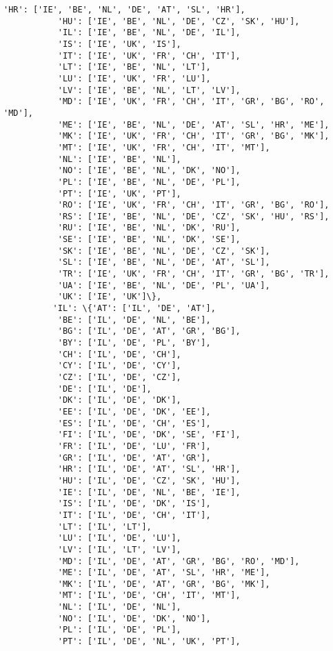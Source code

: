 \documentclass[11pt]{article}
\begin{document}
\begin{Verbatim}[commandchars=\\\{\}]
           'HR': ['IE', 'BE', 'NL', 'DE', 'AT', 'SL', 'HR'],
           'HU': ['IE', 'BE', 'NL', 'DE', 'CZ', 'SK', 'HU'],
           'IL': ['IE', 'BE', 'NL', 'DE', 'IL'],
           'IS': ['IE', 'UK', 'IS'],
           'IT': ['IE', 'UK', 'FR', 'CH', 'IT'],
           'LT': ['IE', 'BE', 'NL', 'LT'],
           'LU': ['IE', 'UK', 'FR', 'LU'],
           'LV': ['IE', 'BE', 'NL', 'LT', 'LV'],
           'MD': ['IE', 'UK', 'FR', 'CH', 'IT', 'GR', 'BG', 'RO', 'MD'],
           'ME': ['IE', 'BE', 'NL', 'DE', 'AT', 'SL', 'HR', 'ME'],
           'MK': ['IE', 'UK', 'FR', 'CH', 'IT', 'GR', 'BG', 'MK'],
           'MT': ['IE', 'UK', 'FR', 'CH', 'IT', 'MT'],
           'NL': ['IE', 'BE', 'NL'],
           'NO': ['IE', 'BE', 'NL', 'DK', 'NO'],
           'PL': ['IE', 'BE', 'NL', 'DE', 'PL'],
           'PT': ['IE', 'UK', 'PT'],
           'RO': ['IE', 'UK', 'FR', 'CH', 'IT', 'GR', 'BG', 'RO'],
           'RS': ['IE', 'BE', 'NL', 'DE', 'CZ', 'SK', 'HU', 'RS'],
           'RU': ['IE', 'BE', 'NL', 'DK', 'RU'],
           'SE': ['IE', 'BE', 'NL', 'DK', 'SE'],
           'SK': ['IE', 'BE', 'NL', 'DE', 'CZ', 'SK'],
           'SL': ['IE', 'BE', 'NL', 'DE', 'AT', 'SL'],
           'TR': ['IE', 'UK', 'FR', 'CH', 'IT', 'GR', 'BG', 'TR'],
           'UA': ['IE', 'BE', 'NL', 'DE', 'PL', 'UA'],
           'UK': ['IE', 'UK']\},
          'IL': \{'AT': ['IL', 'DE', 'AT'],
           'BE': ['IL', 'DE', 'NL', 'BE'],
           'BG': ['IL', 'DE', 'AT', 'GR', 'BG'],
           'BY': ['IL', 'DE', 'PL', 'BY'],
           'CH': ['IL', 'DE', 'CH'],
           'CY': ['IL', 'DE', 'CY'],
           'CZ': ['IL', 'DE', 'CZ'],
           'DE': ['IL', 'DE'],
           'DK': ['IL', 'DE', 'DK'],
           'EE': ['IL', 'DE', 'DK', 'EE'],
           'ES': ['IL', 'DE', 'CH', 'ES'],
           'FI': ['IL', 'DE', 'DK', 'SE', 'FI'],
           'FR': ['IL', 'DE', 'LU', 'FR'],
           'GR': ['IL', 'DE', 'AT', 'GR'],
           'HR': ['IL', 'DE', 'AT', 'SL', 'HR'],
           'HU': ['IL', 'DE', 'CZ', 'SK', 'HU'],
           'IE': ['IL', 'DE', 'NL', 'BE', 'IE'],
           'IS': ['IL', 'DE', 'DK', 'IS'],
           'IT': ['IL', 'DE', 'CH', 'IT'],
           'LT': ['IL', 'LT'],
           'LU': ['IL', 'DE', 'LU'],
           'LV': ['IL', 'LT', 'LV'],
           'MD': ['IL', 'DE', 'AT', 'GR', 'BG', 'RO', 'MD'],
           'ME': ['IL', 'DE', 'AT', 'SL', 'HR', 'ME'],
           'MK': ['IL', 'DE', 'AT', 'GR', 'BG', 'MK'],
           'MT': ['IL', 'DE', 'CH', 'IT', 'MT'],
           'NL': ['IL', 'DE', 'NL'],
           'NO': ['IL', 'DE', 'DK', 'NO'],
           'PL': ['IL', 'DE', 'PL'],
           'PT': ['IL', 'DE', 'NL', 'UK', 'PT'],

\end{Verbatim}
\end{document}
